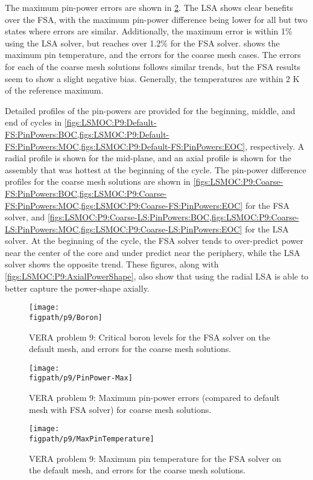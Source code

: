 {{{      The maximum pin-power errors are shown in \cref{fig:LSMOC:P9:Max Pin Power Errors}.
      The \ac{LSA} shows clear benefits over the \ac{FSA}, with the maximum pin-power difference being lower for all but two states where errors are similar.
      Additionally, the maximum error is within 1\% using the \ac{LSA} solver, but reaches over 1.2\% for the \ac{FSA} solver.
       shows the maximum pin temperature, and the errors for the coarse mesh cases.
      The errors for each of the coarse mesh solutions follows similar trends, but the \ac{FSA} results seem to show a slight negative bias.
      Generally, the temperatures are within 2 K of the reference maximum.

      Detailed profiles of the pin-powers are provided for the beginning, middle, and end of cycles in \cref{figs:LSMOC:P9:Default-FS:PinPowers:BOC,figs:LSMOC:P9:Default-FS:PinPowers:MOC,figs:LSMOC:P9:Default-FS:PinPowers:EOC}, respectively.
      A radial profile is shown for the mid-plane, and an axial profile is shown for the assembly that was hottest at the beginning of the cycle.
      The pin-power difference profiles for the coarse mesh solutions are shown in \cref{figs:LSMOC:P9:Coarse-FS:PinPowers:BOC,figs:LSMOC:P9:Coarse-FS:PinPowers:MOC,figs:LSMOC:P9:Coarse-FS:PinPowers:EOC} for the \ac{FSA} solver, and \cref{figs:LSMOC:P9:Coarse-LS:PinPowers:BOC,figs:LSMOC:P9:Coarse-LS:PinPowers:MOC,figs:LSMOC:P9:Coarse-LS:PinPowers:EOC} for the \ac{LSA} solver.
      At the beginning of the cycle, the \ac{FSA} solver tends to over-predict power near the center of the core and under predict near the periphery, while the \ac{LSA} solver shows the opposite trend.
      These figures, along with \cref{figs:LSMOC:P9:AxialPowerShape}, also show that using the radial \ac{LSA} is able to better capture the power-shape axially.

      \begin{figure}[htbp]
        \centering
        \texttt{[image: \\figpath/p9/Boron]}
        \caption{VERA problem 9: Critical boron levels for the FSA solver on the default mesh, and errors for the coarse mesh solutions. \label{fig:LSMOC:P9:Boron}}
      \end{figure}
      \begin{figure}[htbp]
        \centering
        \texttt{[image: \\figpath/p9/PinPower-Max]}
        \caption{VERA problem 9: Maximum pin-power errors (compared to default mesh with FSA solver) for coarse mesh solutions. \label{fig:LSMOC:P9:Max Pin Power Errors}}
      \end{figure}
      \begin{figure}[htbp]
        \centering
        \texttt{[image: \\figpath/p9/MaxPinTemperature]}
        \caption{VERA problem 9: Maximum pin temperature for the FSA solver on the default mesh, and errors for the coarse mesh solutions. \label{fig:LSMOC:P9:Max Pin Temperature}}
      \end{figure}

}}}
